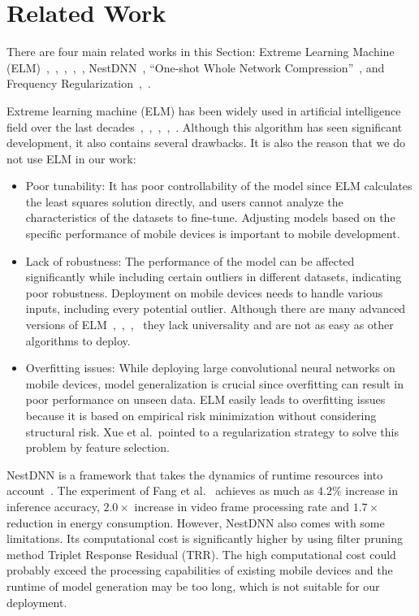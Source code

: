 \documentclass[runningheads]{llncs}
\begin{document}
\section{Related Work}\label{related_work}
There are four main related works in this Section: Extreme Learning Machine (ELM)~\cite{anton2021elm},~\cite{ding2014elmapp},~\cite{wang2022elmapp},~\cite{deng2015elmapp},~\cite{huang2006elmapp}, NestDNN~\cite{fang2018nestdnn}, ``One-shot Whole Network Compression''~\cite{kim2016oneshot}, and Frequency Regularization~\cite{zhao2023fr},~\cite{fr_repo}. 

Extreme learning machine (ELM) has been widely used in artificial intelligence field over the last decades~\cite{anton2021elm},~\cite{ding2014elmapp},~\cite{wang2022elmapp},~\cite{deng2015elmapp},~\cite{huang2006elmapp}. Although this algorithm has seen significant development, it also contains several drawbacks. It is also the reason that we do not use ELM in our work: 
\begin{itemize}
	\item Poor tunability: It has poor controllability of the model since ELM calculates the least squares solution directly, and users cannot analyze the characteristics of the datasets to fine-tune. Adjusting models based on the specific performance of mobile devices is important to mobile development.
	\item Lack of robustness: The performance of the model can be affected significantly while including certain outliers in different datasets, indicating poor robustness. Deployment on mobile devices needs to handle various inputs, including every potential outlier. Although there are many advanced versions of ELM~\cite{john2015advancedelm},~\cite{zhang2015advancedelm},~\cite{zhu2005advancedelm},~\cite{sun2017advancedelm} they lack universality and are not as easy as other algorithms to deploy.
	\item Overfitting issues: While deploying large convolutional neural networks on mobile devices, model generalization is crucial since overfitting can result in poor performance on unseen data. ELM easily leads to overfitting issues because it is based on empirical risk minimization without considering structural risk. Xue et al.~\cite{ying2019overfit}pointed to a regularization strategy to solve this problem by feature selection.
\end{itemize}	 

NestDNN is a framework that takes the dynamics of runtime resources into account~\cite{fang2018nestdnn}. The experiment of Fang et al.~\cite{fang2018nestdnn} achieves as much as $4.2\%$ increase in inference accuracy, $2.0\times$ increase in video frame processing rate and $1.7\times$ reduction in energy consumption. However, NestDNN also comes with some limitations. Its computational cost is significantly higher by using filter pruning method Triplet Response Residual (TRR). The high computational cost could probably exceed the processing capabilities of existing mobile devices and the runtime of model generation may be too long, which is not suitable for our deployment. 
\end{document}
